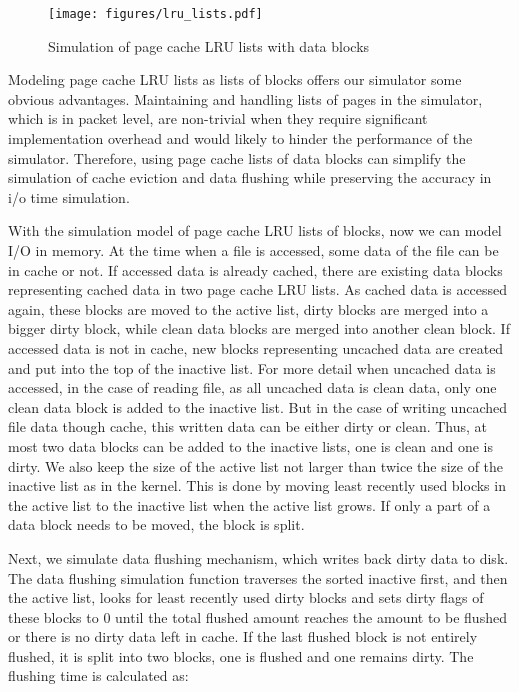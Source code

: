 \documentclass[conference]{IEEEtran}
\begin{document}
			\begin{figure}
   				\centering
   				\texttt{[image: figures/lru\_lists.pdf]}
   				\caption{Simulation of page cache LRU lists with data blocks}\label{fig:lrulist}
			\end{figure}	
			
			Modeling page cache LRU lists as lists of blocks offers our simulator 
			some obvious advantages. 
			Maintaining and handling lists of pages in the simulator, which is in 
			packet level, are non-trivial when they require significant implementation 
			overhead and would likely to hinder the performance of the simulator. 
			Therefore, using page cache lists of data blocks can simplify the 
			simulation of cache eviction and data flushing while preserving
			the accuracy in i/o time simulation. 
			
			With the simulation model of page cache LRU lists of blocks, now we can 
			model I/O in memory.
			At the time when a file is accessed, some data of the file can be in 
			cache or not. 
			If accessed data is already cached, there are existing data blocks 
			representing cached data in two page cache LRU lists. 
			As cached data is accessed again, these blocks are moved to 
			the active list, dirty blocks are merged into a bigger dirty block, 
			while clean data blocks are merged into another clean block. 
			If accessed data is not in cache, new blocks representing uncached data 
			are created and put into the top of the inactive list. 
			For more detail when uncached data is accessed, in the case of 
			reading file, as all uncached data is clean data, only one clean data 
			block is added to the inactive list.
			But in the case of writing uncached file data though cache, 
			this written data can be either dirty or clean. 
			Thus, at most two data blocks can be added to the inactive lists, 
			one is clean and one is dirty. 
			We also keep the size of the active list not larger than twice the size of 
			the inactive list as in the kernel. This is done by moving least recently 
			used blocks in the active list to the inactive list when the active list 
			grows. If only a part of a data block needs to be moved, 
			the block is split.

			Next, we simulate data flushing mechanism, which writes back 
			dirty data to disk. 
			The data flushing simulation function traverses the sorted inactive first, 
			and then the active list, looks for least recently used dirty blocks and 
			sets dirty flags of these blocks to 0 until the total flushed amount 
			reaches the amount to be flushed or there is no dirty data left in cache. 
			If the last flushed block is not entirely flushed, it is split into 
			two blocks, one is flushed and one remains dirty.
			The flushing time is calculated as:
					
\end{document}
